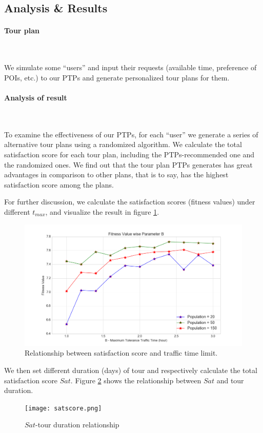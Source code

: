 \documentclass{mcmthesis}
\begin{document}
\subsection{Analysis \& Results}
  \paragraph{Tour plan} \
  
  We simulate some ``users'' and input their requests (available time, preference of POIs, etc.) to our PTPs and generate personalized tour plans for them. 
  \paragraph{Analysis of result} \
  
  To examine the effectiveness of our PTPs, for each ``user'' we generate a series of alternative tour plans using a randomized algorithm. We calculate the total satisfaction score for each tour plan, including the PTPs-recommended one and the randomized ones. We find out that the tour plan PTPs generates has great advantages in comparison to other plans, that is to say, has the highest satisfaction score among the plans. \par
  For further discussion, we calculate the satisfaction scores (fitness values) under different $t_{max}$, and visualize the result in figure \ref{fig:sstt}. \par
  \begin{figure}[ht]
    \centering
    \includegraphics[width=\textwidth]{popularity.png}
    \caption{Relationship between satisfaction score and traffic time limit.}
    \label{fig:sstt}
  \end{figure}
  We then set different duration (days) of tour and respectively calculate the total satisfaction score $Sat$. Figure \ref{fig:satscore} shows the relationship between $Sat$ and tour duration. \par
  \begin{figure}[ht]
    \centering
    \texttt{[image: satscore.png]}
    \caption{$Sat$-tour duration relationship}
    \label{fig:satscore}
  \end{figure}
\end{document}
